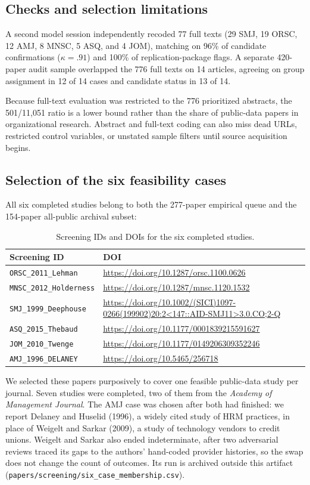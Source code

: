 \documentclass[11pt]{article}
\newcommand{\artifact}[1]{\nolinkurl{#1}}
\begin{document}
\subsection{Checks and selection limitations}
A second model session independently recoded 77 full texts (29 SMJ, 19 ORSC, 12 AMJ, 8 MNSC, 5 ASQ, and 4 JOM), matching on 96\% of candidate confirmations ($\kappa=.91$) and 100\% of replication-package flags. A separate 420-paper audit sample overlapped the 776 full texts on 14 articles, agreeing on group assignment in 12 of 14 cases and candidate status in 13 of 14.

Because full-text evaluation was restricted to the 776 prioritized abstracts, the 501/11,051 ratio is a lower bound rather than the share of public-data papers in organizational research. Abstract and full-text coding can also miss dead URLs, restricted control variables, or unstated sample filters until source acquisition begins.

\subsection{Selection of the six feasibility cases}
All six completed studies belong to both the 277-paper empirical queue and the 154-paper all-public archival subset:
\begin{table}[H]\centering\small
\begin{tabularx}{\linewidth}{@{}lY@{}}\toprule
Screening ID & DOI\\\midrule
\artifact{ORSC_2011_Lehman} & \url{https://doi.org/10.1287/orsc.1100.0626}\\
\artifact{MNSC_2012_Holderness} & \url{https://doi.org/10.1287/mnsc.1120.1532}\\
\artifact{SMJ_1999_Deephouse} & \url{https://doi.org/10.1002/(SICI)1097-0266(199902)20:2<147::AID-SMJ11>3.0.CO;2-Q}\\
\artifact{ASQ_2015_Thebaud} & \url{https://doi.org/10.1177/0001839215591627}\\
\artifact{JOM_2010_Twenge} & \url{https://doi.org/10.1177/0149206309352246}\\
\artifact{AMJ_1996_DELANEY} & \url{https://doi.org/10.5465/256718}\\\bottomrule
\end{tabularx}\caption{Screening IDs and DOIs for the six completed studies.}\end{table}
We selected these papers purposively to cover one feasible public-data study per journal. Seven studies were completed, two of them from the \textit{Academy of Management Journal}. The AMJ case was chosen after both had finished: we report Delaney and Huselid (1996), a widely cited study of HRM practices, in place of Weigelt and Sarkar (2009), a study of technology vendors to credit unions. Weigelt and Sarkar also ended indeterminate, after two adversarial reviews traced its gaps to the authors' hand-coded provider histories, so the swap does not change the count of outcomes. Its run is archived outside this artifact (\artifact{papers/screening/six_case_membership.csv}).
\end{document}
